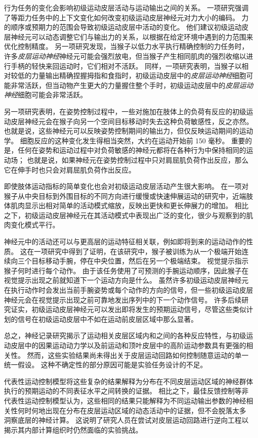 行为任务的变化会影响初级运动皮层活动与运动输出之间的关系。
一项研究强调了等距力任务中的上下文变化如何改变初级运动皮层神经元对力大小的编码。
力的顺序或预期力的范围会导致初级运动皮层中活动的变化。
他们建议初级运动皮层神经元可以动态调整它们与输出力的关系，以根据在给定环境中遇到的力范围来优化控制精度。
另一项研究发现，当猴子以低力水平执行精确控制的力任务时，许多\textit{皮层运动神经}神经元可能会强烈放电，但当猴子产生相同肌肉的强烈收缩以进行手柄的轻快来回运动时，它们相对不活跃。
同样，一项研究表明，当猴子以相对较低的力量输出精确捏握拇指和食指时，初级运动皮层中的\textit{皮层运动神经}细胞可能非常活跃，但当动物产生更大的力量握住整个手时，初级运动皮层中的\textit{皮层运动神经}细胞可能会非常活跃。


另一项研究表明，在姿势控制过程中，一些对施加在肢体上的负荷有反应的初级运动皮层神经元会在猴子向另一个空间目标移动时失去这种负荷敏感性，反之亦然。
也就是说，这些神经元可以反映姿势控制期间的输出力，但仅反映运动期间的运动学。
细胞反应的这种变化发生得相当突然，大约在运动开始前 150 毫秒。
重要的是，任何在姿势和运动过程中对负荷敏感的神经元都将在各种行为中保持相同的运动场；
也就是说，如果神经元在姿势控制过程中只对肩屈肌负荷作出反应，那么它在伸手时也只会对肩屈肌负荷作出反应。


即使肢体运动指标的简单变化也会对初级运动皮层活动产生很大影响。
在一项对猴子从中央目标到外围目标的不同方向进行缓慢或快速伸展运动的研究中，近端肢体肌肉显示出相对简单的活动模式缩放，反映出更快和更长伸展力的增加。
相比之下，初级运动皮层神经元在其活动模式中表现出广泛的变化，很少与观察到的肌肉变化模式平行。


神经元中的活动还可以与更高层的运动特征相关联，例如即将到来的运动动作的性质。 
这在一项研究中得到了证明，在该研究中，猴子被训练为从一个极端开始连续向三个目标移动手腕，停在中央位置，然后在另一个极端结束。
视觉提示指示猴子何时进行每个动作。
由于该任务使用了可预测的手腕运动顺序，因此猴子在视觉提示出现之前就知道下一个运动方向是什么。
虽然许多初级运动皮层神经元在执行动作时会发出当前手腕姿势或每个动作的方向的信号，但一些初级运动皮层神经元会在视觉提示出现之前可靠地发出序列中的下一个动作信号。
许多后续研究证实，初级运动皮层神经元可以发出即将发生的预期运动信号，尽管这些类似计划的信号在初级运动皮层中不如在运动前皮层区域中那么显著。


总之，神经记录研究揭示了运动相关皮层区域内和之间的各种反应特性，与初级运动皮层中的因果运动动力学以及前运动和顶叶皮层中的高阶运动参数具有更强的相关性。
然而，这些实验结果尚未得出关于皮层运动回路如何控制随意运动的单一统一假设。
这种不确定性的部分原因可能是实验任务设计的不足。


代表性运动控制模型将这些复杂的结果解释为分布在不同皮层运动区域的神经群体执行的预期运动的不同表征水平之间转换的证据。
相比之下，最佳反馈控制等非代表性运动控制模型认为，这些相同的结果只能解释为不同运动输出参数的神经相关性何时何地出现在分布在皮层运动区域的动态活动中的证据，但不会脱落太多 洞察底层的神经计算。
这说明了研究人员在尝试对皮层运动回路进行逆向工程以揭示其内部计算组织时仍然面临的实验挑战。



